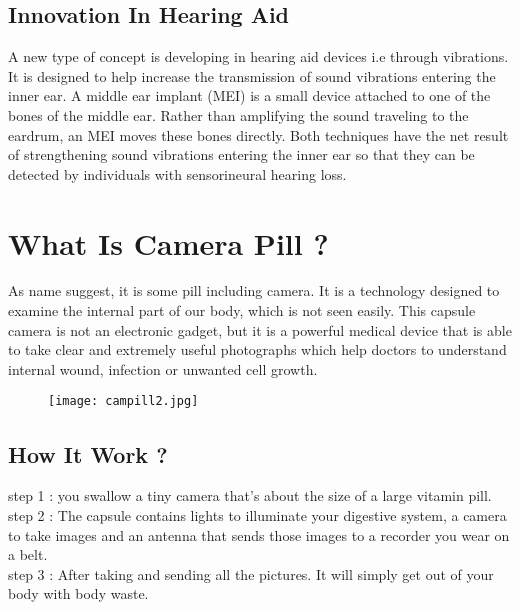 \documentclass[12pt]{article}
\begin{document}
\subsection{Innovation In Hearing Aid}
A new type of concept is developing in hearing aid devices i.e through vibrations. It is 
designed to help increase the transmission of sound vibrations entering the inner ear. A middle ear implant (MEI) is a small device attached to one of the bones of the middle ear. Rather than amplifying the sound traveling to the eardrum, an MEI moves these bones directly. Both techniques have the net result of strengthening sound vibrations entering the inner ear so that they can be detected by individuals with sensorineural hearing loss.


\clearpage





\section{What Is Camera Pill ?}
As name suggest, it is some pill including camera.
It is a technology designed to examine the internal part of our body, which is not seen easily.
This capsule camera is not an electronic gadget, but it is a powerful medical device that is able to take clear and extremely useful photographs which help doctors to understand internal wound, infection or unwanted cell growth.
\begin{figure}[h]
\centering
\texttt{[image: campill2.jpg]}

\end{figure} 
 

\subsection{How It Work ?}


\begin{flushleft}

step 1 : you swallow a tiny camera that's about the size of a large vitamin pill.\\

step 2 : The capsule contains lights to illuminate your digestive system, a camera to take images and an antenna that sends those images to a recorder you wear on a belt.\\


step 3 : After taking and sending all the pictures. It will simply get out of your body with body waste.
\end{flushleft}
\end{document}
